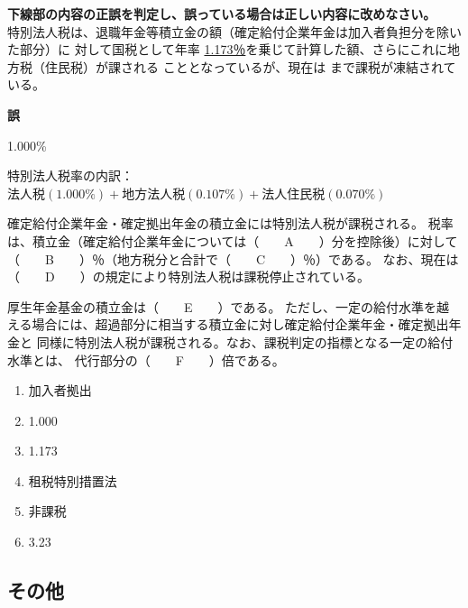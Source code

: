 \begin{truefalse}[年金1 H29 問題1(6)\textcircled{2}（改題）]
      \textbf{下線部の内容の正誤を判定し、誤っている場合は正しい内容に改めなさい。}
\\  

  特別法人税は、退職年金等積立金の額（確定給付企業年金は加入者負担分を除いた部分）に
対して国税として年率 \underline{1.173％}を乗じて計算した額、さらにこれに地方税（住民税）が課される
こととなっているが、現在は \TouketsuDate まで課税が凍結されている。
\end{truefalse}

\begin{answerbox}
  \textbf{誤}

  1.000\%
\end{answerbox}

\begin{explanationbox}
  特別法人税率の内訳：$法人税(1.000\%)+地方法人税(0.107\%)+法人住民税(0.070\%)$
\end{explanationbox}

\begin{fillblank}[数理人試験 H19 問題1(9)（改題）]
  確定給付企業年金・確定拠出年金の積立金には特別法人税が課税される。
  税率は、積立金（確定給付企業年金については（　　A　　）分を控除後）に対して（　　B　　）％（地方税分と合計で（　　C　　）％）である。
  なお、現在は（　　D　　）の規定により特別法人税は課税停止されている。

  厚生年金基金の積立金は（　　E　　）である。
  ただし、一定の給付水準を越える場合には、超過部分に相当する積立金に対し確定給付企業年金・確定拠出年金と
  同様に特別法人税が課税される。なお、課税判定の指標となる一定の給付水準とは、
  代行部分の（　　F　　）倍である。
\end{fillblank}

\begin{answerbox}
  \begin{enumerate}[A:]
    \item 加入者拠出
    \item 1.000
    \item 1.173
    \item 租税特別措置法
    \item 非課税
    \item 3.23
  \end{enumerate}
\end{answerbox}

\newpage

\subsection{その他}

